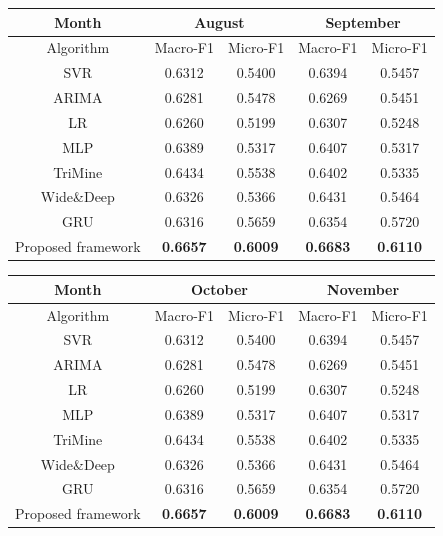 \begin{table}[htb]
\centering

\begin{tabular}{c|c|c|c|c}
\toprule
Month
 &\multicolumn{2}{|c|}{August}
&
\multicolumn{2}{|c}{September}\\[0.1cm]
\hline
Algorithm & Macro-F1 & Micro-F1    & Macro-F1 & Micro-F1 \\[0.1cm]
\hline
SVR & 0.6312 & 0.5400 & 0.6394 & 0.5457\\[0.1cm]
ARIMA & 0.6281 & 0.5478 & 0.6269 & 0.5451\\[0.1cm]
LR & 0.6260 & 0.5199 & 0.6307 & 0.5248\\[0.1cm]
MLP & 0.6389 & 0.5317 & 0.6407 & 0.5317\\[0.1cm]
TriMine & 0.6434 & 0.5538 & 0.6402 & 0.5335\\[0.1cm]
Wide\&Deep & 0.6326 & 0.5366 & 0.6431 & 0.5464\\[0.1cm]
GRU & 0.6316 & 0.5659 & 0.6354 & 0.5720\\[0.1cm]
\toprule
Proposed framework & \textbf{0.6657} & \textbf{0.6009} & \textbf{0.6683} & \textbf{0.6110}\\
\bottomrule
\end{tabular}

\vspace{0.2cm}
\begin{tabular}{c|c|c|c|c}
\toprule
Month
 &\multicolumn{2}{|c|}{October}
&
\multicolumn{2}{|c}{November}\\[0.1cm]
\hline
Algorithm & Macro-F1 & Micro-F1    & Macro-F1 & Micro-F1 \\[0.1cm]
\hline
SVR & 0.6312 & 0.5400 & 0.6394 & 0.5457\\[0.1cm]
ARIMA & 0.6281 & 0.5478 & 0.6269 & 0.5451\\[0.1cm]
LR & 0.6260 & 0.5199 & 0.6307 & 0.5248\\[0.1cm]
MLP & 0.6389 & 0.5317 & 0.6407 & 0.5317\\[0.1cm]
TriMine & 0.6434 & 0.5538 & 0.6402 & 0.5335\\[0.1cm]
Wide\&Deep & 0.6326 & 0.5366 & 0.6431 & 0.5464\\[0.1cm]
GRU & 0.6316 & 0.5659 & 0.6354 & 0.5720\\[0.1cm]
\toprule
Proposed framework & \textbf{0.6657} & \textbf{0.6009} & \textbf{0.6683} & \textbf{0.6110}\\
\bottomrule
\end{tabular}


\end{table}
